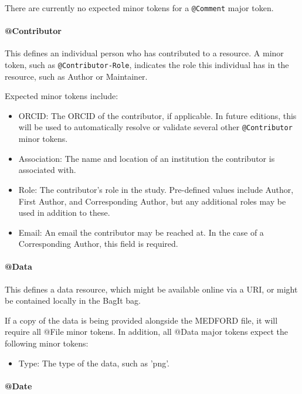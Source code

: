 \documentclass[10pt]{article}
\begin{document}
    There are currently no expected minor tokens for a \texttt{@Comment} major token.
    
    \paragraph{@Contributor}
    
    This defines an individual person who has contributed to a resource. A minor token, such as \texttt{@Contributor-Role}, indicates the role this individual has in the resource, such as Author or Maintainer.
    
    Expected minor tokens include:
    \begin{itemize}
        \item ORCID: The ORCID of the contributor, if applicable. In future editions, this will be used to automatically resolve or validate several other \texttt{@Contributor} minor tokens.
        \item Association: The name and location of an institution the contributor is associated with.
        \item Role: The contributor's role in the study. Pre-defined values include Author, First Author, and Corresponding Author, but any additional roles may be used in addition to these.
        \item Email: An email the contributor may be reached at. In the case of a Corresponding Author, this field is required.
    \end{itemize}
    
    \paragraph{@Data}
    
    This defines a data resource, which might be available online via a URI, or might be contained locally in the BagIt bag.
    
    If a copy of the data is being provided alongside the MEDFORD file, it will require all @File minor tokens. In addition, all @Data major tokens expect the following minor tokens:
    \begin{itemize}
        \item Type: The type of the data, such as 'png'.
    \end{itemize}
    
    \paragraph{@Date}
    
\end{document}
